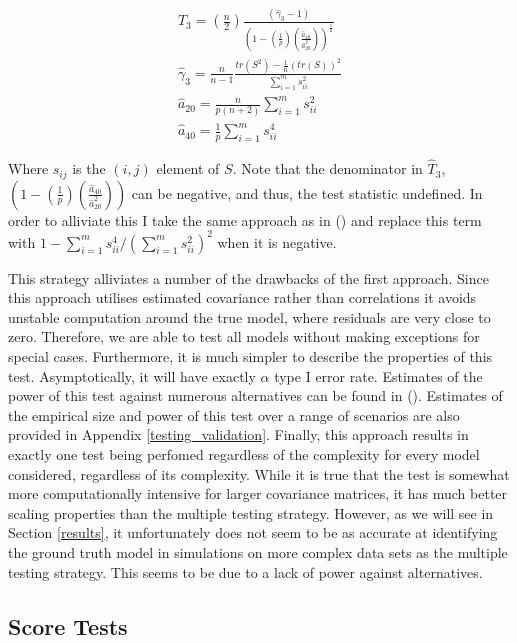 \documentclass{article}
\begin{document}
\begin{align}
  \hat{T}_3 = \left(\frac{n}2{}\right)\frac{(\hat{\gamma}_3-1)}{\left(1-\left(\frac{1}{p}\right)\left(\frac{\hat{a}_{40}}{\hat{a}^2_{20}}\right)\right)^\frac{1}{2}} \label{t3} \\
  \hat{\gamma}_3 = \frac{n}{n-1}\frac{tr(S^2) - \frac{1}{n}(tr(S))^2}{\sum_{i=1}^ms^2_{ii}} \\
  \hat{a}_{20} = \frac{n}{p(n+2)}\sum_{i=1}^ms^2_{ii} \\
  \hat{a}_{40} = \frac{1}{p}\sum_{i=1}^ms^4_{ii} \label{a40}
\end{align}

Where $s_{ij}$ is the $(i,j)$ element of $S$. Note that the denominator in $\hat{T}_3$, $\left(1-\left(\frac{1}{p}\right)\left(\frac{\hat{a}_{40}}{\hat{a}^2_{20}}\right)\right)$ can be negative, and thus, the test statistic undefined. In order to alliviate this I take the same approach as in \citeauthor{wang2013necessary} (\citeyear{wang2013necessary}) and replace this term with $1-\sum_{i=1}^ms^4_{ii}/\left(\sum_{i=1}^ms^2_{ii}\right)^2$ when it is negative.

This strategy alliviates a number of the drawbacks of the first approach. Since this approach utilises estimated covariance rather than correlations it avoids unstable computation around the true model, where residuals are very close to zero. Therefore, we are able to test all models without making exceptions for special cases. Furthermore, it is much simpler to describe the properties of this test. Asymptotically, it will have exactly $\alpha$ type I error rate. Estimates of the power of this test against numerous alternatives can be found in \citeauthor{wang2013necessary} (\citeyear{wang2013necessary}). Estimates of the empirical size and power of this test over a range of scenarios are also provided in Appendix \ref{testing_validation}. Finally, this approach results in exactly one test being perfomed regardless of the complexity for every model considered, regardless of its complexity. While it is true that the test is somewhat more computationally intensive for larger covariance matrices, it has much better scaling properties than the multiple testing strategy. However, as we will see in Section \ref{results}, it unfortunately does not seem to be as accurate at identifying the ground truth model in simulations on more complex data sets as the multiple testing strategy. This seems to be due to a lack of power against alternatives.

\subsection{Score Tests} \label{scoretests}
\end{document}
